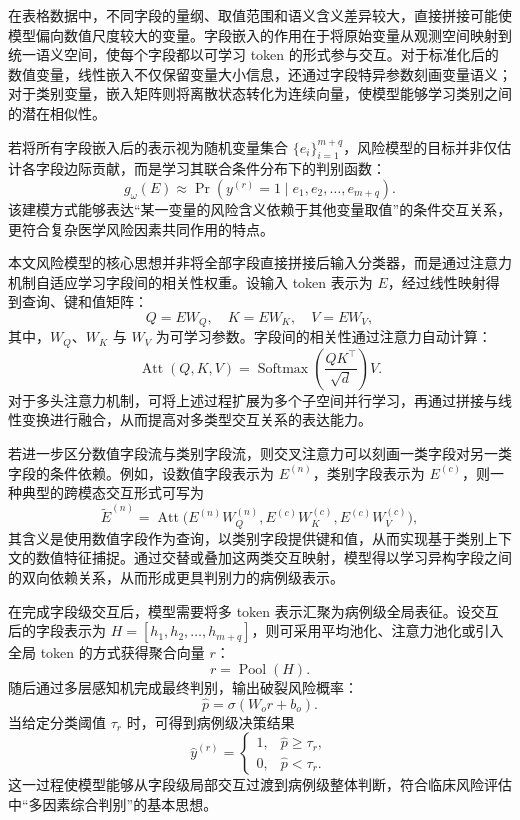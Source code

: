 在表格数据中，不同字段的量纲、取值范围和语义含义差异较大，直接拼接可能使模型偏向数值尺度较大的变量。字段嵌入的作用在于将原始变量从观测空间映射到统一语义空间，使每个字段都以可学习 token 的形式参与交互。对于标准化后的数值变量，线性嵌入不仅保留变量大小信息，还通过字段特异参数刻画变量语义；对于类别变量，嵌入矩阵则将离散状态转化为连续向量，使模型能够学习类别之间的潜在相似性。

若将所有字段嵌入后的表示视为随机变量集合 $\{e_i\}_{i=1}^{m+q}$，风险模型的目标并非仅估计各字段边际贡献，而是学习其联合条件分布下的判别函数：
\begin{equation}
g_{\omega}(E)\approx \Pr(y^{(r)}=1\mid e_1,e_2,\ldots,e_{m+q}).
\end{equation}
该建模方式能够表达“某一变量的风险含义依赖于其他变量取值”的条件交互关系，更符合复杂医学风险因素共同作用的特点。

本文风险模型的核心思想并非将全部字段直接拼接后输入分类器，而是通过注意力机制自适应学习字段间的相关性权重。设输入 token 表示为 $E$，经过线性映射得到查询、键和值矩阵：
\begin{equation}
Q=EW_Q,\quad K=EW_K,\quad V=EW_V,
\end{equation}
其中，$W_Q$、$W_K$ 与 $W_V$ 为可学习参数。字段间的相关性通过注意力自动计算：
\begin{equation}
\operatorname{Att}(Q,K,V)=\operatorname{Softmax}\left(\frac{QK^{\top}}{\sqrt{d}}\right)V.
\end{equation}
对于多头注意力机制，可将上述过程扩展为多个子空间并行学习，再通过拼接与线性变换进行融合，从而提高对多类型交互关系的表达能力。

若进一步区分数值字段流与类别字段流，则交叉注意力可以刻画一类字段对另一类字段的条件依赖。例如，设数值字段表示为 $E^{(n)}$，类别字段表示为 $E^{(c)}$，则一种典型的跨模态交互形式可写为
\begin{equation}
\widetilde{E}^{(n)} = \operatorname{Att}\bigl(E^{(n)}W_Q^{(n)},E^{(c)}W_K^{(c)},E^{(c)}W_V^{(c)}\bigr),
\end{equation}
其含义是使用数值字段作为查询，以类别字段提供键和值，从而实现基于类别上下文的数值特征捕捉。通过交替或叠加这两类交互映射，模型得以学习异构字段之间的双向依赖关系，从而形成更具判别力的病例级表示。

在完成字段级交互后，模型需要将多 token 表示汇聚为病例级全局表征。设交互后的字段表示为 $H=[h_1,h_2,\ldots,h_{m+q}]$，则可采用平均池化、注意力池化或引入全局 token 的方式获得聚合向量 $r$：
\begin{equation}
r = \operatorname{Pool}(H).
\end{equation}
随后通过多层感知机完成最终判别，输出破裂风险概率：
\begin{equation}
\hat{p}=\sigma(W_o r + b_o).
\end{equation}
当给定分类阈值 $\tau_r$ 时，可得到病例级决策结果
\begin{equation}
\hat{y}^{(r)}=
\begin{cases}
1, & \hat{p}\geq \tau_r,\\
0, & \hat{p}<\tau_r.
\end{cases}
\end{equation}
这一过程使模型能够从字段级局部交互过渡到病例级整体判断，符合临床风险评估中“多因素综合判别”的基本思想。

